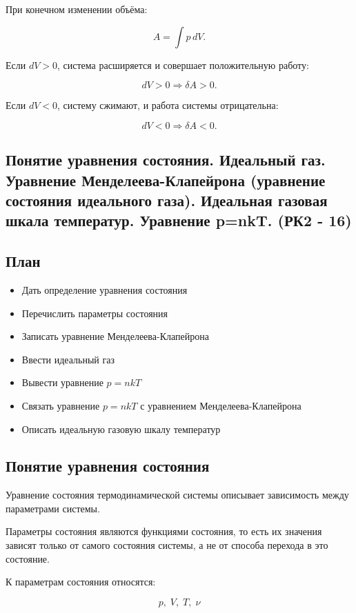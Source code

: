 \documentclass[a4paper,12pt]{article}
\begin{document}
При конечном изменении объёма:

\[
A=\int p\,dV.
\]

Если $dV>0$, система расширяется и совершает положительную работу:

\[
dV>0\Rightarrow \delta A>0.
\]

Если $dV<0$, систему сжимают, и работа системы отрицательна:

\[
dV<0\Rightarrow \delta A<0.
\] 

\subsection{Понятие уравнения состояния. Идеальный газ. Уравнение Менделеева-Клапейрона (уравнение состояния идеального газа). Идеальная газовая шкала температур. Уравнение p=nkT. (РК2 - 16)}

\subsection*{План}
\begin{itemize}
\item Дать определение уравнения состояния
\item Перечислить параметры состояния
\item Записать уравнение Менделеева-Клапейрона
\item Ввести идеальный газ
\item Вывести уравнение $p=nkT$
\item Связать уравнение $p=nkT$ с уравнением Менделеева-Клапейрона
\item Описать идеальную газовую шкалу температур
\end{itemize}

\subsection*{Понятие уравнения состояния}

\begin{definitionbox}
Уравнение состояния термодинамической системы описывает зависимость между параметрами системы.
\end{definitionbox}

Параметры состояния являются функциями состояния, то есть их значения зависят только от самого состояния системы, а не от способа перехода в это состояние.

К параметрам состояния относятся:

\[
p,\; V,\; T,\; \nu
\]
\end{document}
